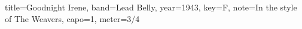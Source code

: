 \documentclass{skrul-leadsheet}
\begin{document}
\begin{song}[transpose-capo=true]{title={Goodnight Irene}, band={Lead Belly}, year={1943}, key={F}, note={In the style of The Weavers}, capo={1}, meter={3/4}}



\end{song}
\end{document}
